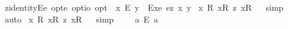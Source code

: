\begin{isabellebody}
\isanewline
{}\isamarkupfalse%
\ z{\isacharunderscore}identityE{\isacharcolon}{\isacharcolon}{\isachardoublequoteopen}{\isacharparenleft}e\ opt{\isasymRightarrow}e\ opt{\isasymRightarrow}io\ opt{\isacharparenright}{\isachardoublequoteclose}\ \ {\isachardoublequoteopen}x\ {\isacharequal}\isactrlsub E\ y\ {\isasymequiv}\ {\isacharparenleft}Exe{}\ {\isacharequal}\isactrlsub e\isactrlsup z\ x\ y{\isacharparenright}{\isachardoublequoteclose}%
\isamarkuptrue%
\isamarkupfalse%
\ {\isachardoublequoteopen}{\isacharbrackleft}{\isasymforall}{\isacharparenleft}{\isasymlambda}x{\isachardot}\ {\isasymexists}{\isacharparenleft}{\isasymlambda}R{\isachardot}\ {\isacharparenleft}{\isacharless}{\isachardot}x{\isachardot}{\isasymcirc}{\isachardot}R{\isachardot}{\isachargreater}\ {\isasymrightarrow}\isactrlsup z\ {\isacharless}{\isachardot}x{\isachardot}{\isasymcirc}R{}{\isachargreater}{\isacharparenright}{\isacharparenright}{\isacharparenright}{\isacharbrackright}{\isachardoublequoteclose}%
\isadelimproof
\ %
\endisadelimproof
%
\isatagproof
{}\isamarkupfalse%
\ {\isacharparenleft}simp{\isacharparenright}\ \isamarkupfalse%
\ auto%
\endisatagproof
{\isafoldproof}%
%
\isadelimproof
%
\endisadelimproof
\isanewline
{}\isamarkupfalse%
\ {\isachardoublequoteopen}{\isacharbrackleft}{\isasymforall}{\isacharparenleft}{\isasymlambda}x{\isachardot}\ {\isasymforall}{\isacharparenleft}{\isasymlambda}R{\isachardot}\ {\isacharparenleft}{\isacharless}{\isachardot}x{\isachardot}{\isasymcirc}{\isachardot}R{\isachardot}{\isachargreater}\ {\isasymrightarrow}\isactrlsup z\ {\isacharless}{\isachardot}x{\isachardot}{\isasymcirc}R{}{\isachargreater}{\isacharparenright}{\isacharparenright}{\isacharparenright}{\isacharbrackright}{\isachardoublequoteclose}%
\isadelimproof
\ %
\endisadelimproof
%
\isatagproof
{}\isamarkupfalse%
\ {\isacharparenleft}simp{\isacharparenright}%
\endisatagproof
{\isafoldproof}%
%
\isadelimproof
%
\endisadelimproof
\ \isamarkupfalse%
%
\isadelimproof
\ %
\endisadelimproof
%
\isatagproof
{}\isamarkupfalse%
%
\endisatagproof
{\isafoldproof}%
%
\isadelimproof
%
\endisadelimproof
\isanewline
\isanewline
{}\isamarkupfalse%
\ {\isachardoublequoteopen}{\isacharbrackleft}a\ {\isacharequal}\isactrlsub E\ a{\isacharbrackright}{\isachardoublequoteclose}%
\isadelimproof
\ %
\endisadelimproof
%
\isatagproof
{}\isamarkupfalse%

\end{isabellebody}
